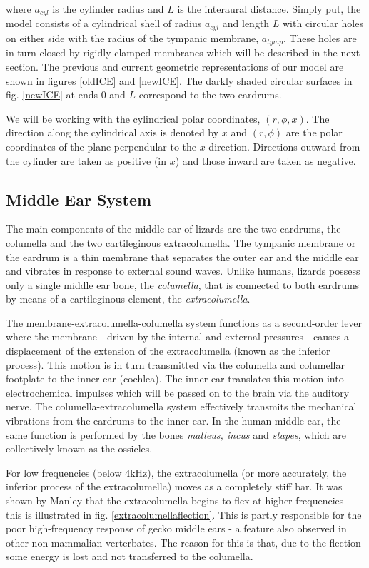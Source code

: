 where $a_{cyl}$ is the cylinder radius and $L$ is the interaural distance. Simply put, the model consists of a cylindrical shell
of radius $a_{cyl}$ and length $L$ with circular holes on either side with the radius of the tympanic membrane, $a_{tymp}$. These
holes are in turn closed by rigidly clamped membranes which will be described in the next section. The previous and current geometric representations
of our model are shown in figures \ref{oldICE} and \ref{newICE}. The darkly shaded circular surfaces in fig. \ref{newICE} at ends $0$ and $L$ correspond to the two
eardrums.

We will be working with the cylindrical polar coordinates, $(r,\phi,x)$. The direction
along the cylindrical axis is denoted by $x$ and $(r,\phi)$ are the polar coordinates of the plane perpendular to the $x$-direction. 
Directions outward from the cylinder are taken as positive (in $x$) and those inward are taken as negative.
\subsection{Middle Ear System}\label{middleear}
The main components of the middle-ear of lizards are the two eardrums, the columella and the two cartileginous extracolumella.  
The tympanic membrane or the eardrum is a thin membrane that separates the outer ear and the
middle ear and vibrates in response to external sound waves.  Unlike humans, lizards 
possess only a single middle ear bone, the \textit{columella},
that is connected to both eardrums by means of a cartileginous element, the \textit{extracolumella}.

The membrane-extracolumella-columella system functions
as a second-order lever where the membrane - driven by the internal and external pressures - causes a displacement
of the extension of the extracolumella (known as the inferior process). This motion is in turn transmitted 
via the columella and columellar footplate to the inner ear (cochlea). The inner-ear translates this motion into
electrochemical impulses which will be passed on to the brain via the auditory nerve. The columella-extracolumella system effectively
transmits the mechanical vibrations from the eardrums to the inner ear. 
In the human middle-ear, the same function is
performed by the bones \textit{malleus, incus} and \textit{stapes}, which are collectively known
as the ossicles. 

For low frequencies (below $4$kHz), the extracolumella (or more accurately, the inferior process of the extracolumella)
moves as a completely stiff bar. It was shown by Manley \cite{manleygecko2} that the extracolumella begins to flex at higher frequencies - 
this is illustrated in fig. \ref{extracolumellaflection}. This is partly responsible for the poor high-frequency response of gecko middle ears - 
a feature also observed in other non-mammalian verterbates. The reason for this is that, due to the flection some energy is lost and
not transferred to the columella.

